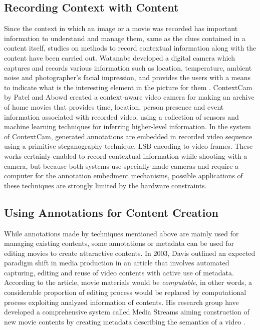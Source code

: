 \subsection{Recording Context with Content}
Since the context in which an image or a movie was recorded has important information to understand and manage them, same as the clues contained in a content itself, studies on methods to record contextual information along with the content have been carried out.
Watanabe developed a digital camera which captures and records various information such as location, temperature, ambient noise and photographer's facial impression, and provides the users with a means to indicate what is the interesting element in the picture for them \cite{Watanabe:2007:WDC:1240866.1241073}.
ContextCam by Patel and Abowd \cite{Patel04thecontextcam:} created a context-aware video camera for making an archive of home movies that provides time, location, person presence and event information associated with recorded video, using a collection of sensors and machine learning techniques for inferring higher-level information.
In the system of ContextCam, generated annotations are embedded in recorded video sequence using a primitive steganography technique, LSB encoding to video frames.
These works certainly enabled to record contextual information while shooting with a camera, but because both systems use specially made cameras and require a computer for the annotation embedment mechanisms, possible applications of these techniques are strongly limited by the hardware constraints.

\subsection{Using Annotations for Content Creation}
While annotations made by techniques mentioned above are mainly used for managing existing contents, some annotations or metadata can be used for editing movies to create attaractive contents.
In 2003, Davis outlined an expected paradigm shift in media production in an article \cite{davis2003editing} that involves automated capturing, editing and reuse of video contents with active use of metadata.
According to the article, movie materials would be {\it computable}, in other words, a considerable proportion of editing process would be replaced by computational process exploiting analyzed information of contents.
His research group have developed a comprehensive system called Media Streams aiming construction of new movie contents by creating metadata describing the semantics of a video \cite{davis2000media}.

